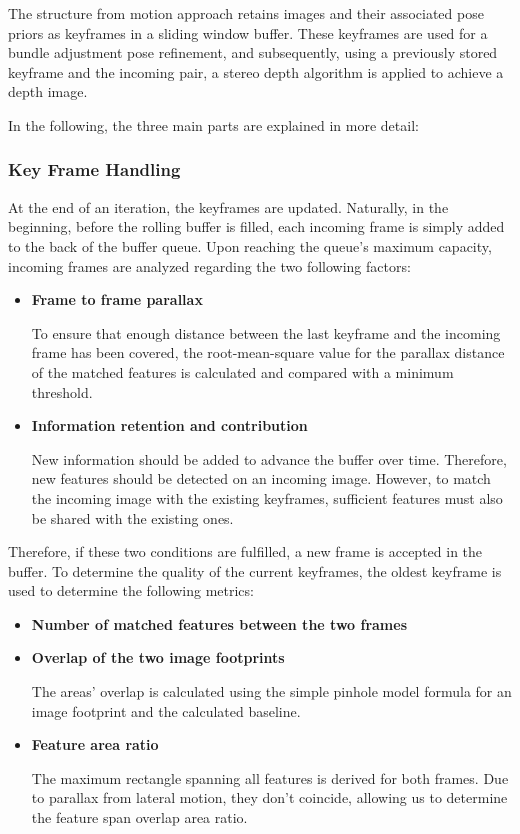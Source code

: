 \documentclass{article}
\begin{document}
The structure from motion approach retains images and their associated pose priors as keyframes in a sliding window buffer. These keyframes are used for a bundle adjustment pose refinement, and subsequently, using a previously stored keyframe and the incoming pair, a stereo depth algorithm is applied to achieve a depth image. 

In the following, the three main parts are explained in more detail:

\subsubsection{Key Frame Handling}

At the end of an iteration, the keyframes are updated. Naturally, in the beginning, before the rolling buffer is filled, each incoming frame is simply added to the back of the buffer queue. Upon reaching the queue's maximum capacity, incoming frames are analyzed regarding the two following factors:

\begin{itemize}
    \item \textbf{Frame to frame parallax}

    To ensure that enough distance between the last keyframe and the incoming frame has been covered, the root-mean-square value for the parallax distance of the matched features is calculated and compared with a minimum threshold.
    \item \textbf{Information retention and contribution}

    New information should be added to advance the buffer over time. Therefore, new features should be detected on an incoming image. However, to match the incoming image with the existing keyframes, sufficient features must also be shared with the existing ones.
\end{itemize}

Therefore, if these two conditions are fulfilled, a new frame is accepted in the buffer. To determine the quality of the current keyframes, the oldest keyframe is used to determine the following metrics:

\begin{itemize}
    \item \textbf{Number of matched features between the two frames}
    \item \textbf{Overlap of the two image footprints}
    
    The areas' overlap is calculated using the simple pinhole model formula for an image footprint and the calculated baseline.
    \item \textbf{Feature area ratio}
    
    The maximum rectangle spanning all features is derived for both frames. Due to parallax from lateral motion, they don't coincide, allowing us to determine the feature span overlap area ratio.
\end{itemize}
\end{document}
